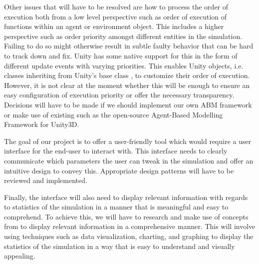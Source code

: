 Other issues that will have to be resolved are how to process the order of execution both from a low level perspective such as order of execution of functions within an agent or environment object. This includes a higher perspective such as order priority amongst different entities in the simulation. Failing to do so might otherwise result in subtle faulty behavior that can be hard to track down and fix. Unity has some native support for this in the form of different update events with varying priorities. This enables Unity objects, i.e. classes inheriting from Unity's base class , to customize their order of execution. However, it is not clear at the moment whether this will be enough to ensure an easy configuration of execution priority or offer the necessary transparency. Decisions will have to be made if we should implement our own ABM framework or make use of existing  such as the open-source Agent-Based Modelling Framework for Unity3D\cite{abmu}.

The goal of our project is to offer a user-friendly tool which would require a user interface for the end-user to interact with. This interface needs to clearly communicate which parameters the user can tweak in the simulation and offer an intuitive design to convey this. Appropriate  design patterns will have to be reviewed and implemented.

Finally, the interface will also need to display relevant information with regards to statistics of the simulation in a manner that is meaningful and easy to comprehend. To achieve this, we will have to research and make use of concepts from  to display relevant information in a comprehensive manner. This will involve using techniques such as data visualization, charting, and graphing to display the statistics of the simulation in a way that is easy to understand and visually appealing.
